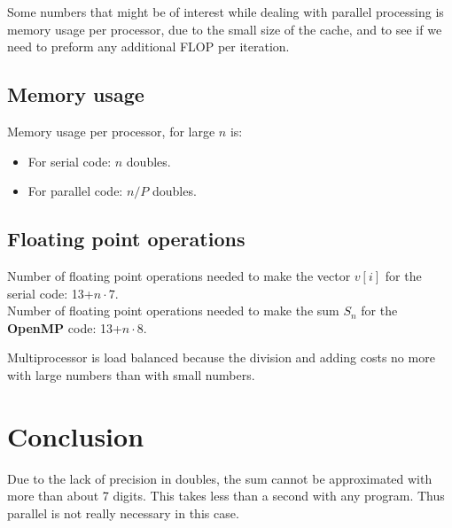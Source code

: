 Some numbers that might be of interest while dealing with parallel processing is memory usage per processor, due to the small size of the cache, and to see if we need to preform any additional FLOP per iteration.

\subsection{Memory usage}
Memory usage per processor, for large $n$ is: \\
\begin{itemize}
\item For serial code: $n$ doubles.\\
\item For parallel code: $n/P$ doubles.
\end{itemize}


\subsection{Floating point operations}

Number of floating point operations needed to make the vector $v[i]$ for the serial code:  13+$n\cdot7$.\\
Number of floating point operations needed to make the sum $S_n$ for the \textbf{OpenMP} code:  13+$n\cdot8$.

Multiprocessor is load balanced because the division and adding costs no more with large numbers than with small numbers.





\section{Conclusion}
Due to the lack of precision in doubles, the sum cannot be approximated with more than about 7 digits. This takes less than a second with any program. Thus parallel is not really necessary in this case.


